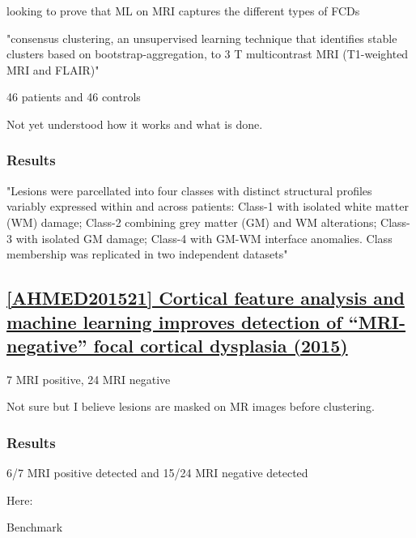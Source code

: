 looking to prove that ML on MRI captures the different types of FCDs

"consensus clustering, an unsupervised learning technique that identifies stable clusters based on bootstrap-aggregation, to 3 T multicontrast MRI (T1-weighted MRI and FLAIR)"

46 patients and 46 controls

Not yet understood how it works and what is done.

\subsubsection{Results}

"Lesions were parcellated into four classes with distinct structural profiles variably expressed within and across patients: Class-1 with isolated white matter (WM) damage; Class-2 combining grey matter (GM) and WM alterations; Class-3 with isolated GM damage; Class-4 with GM-WM interface anomalies. Class membership was replicated in two independent datasets"

\newpage
\subsection{\href{https://www.sciencedirect.com/science/article/pii/S1525505015002322}{[AHMED201521] Cortical feature analysis and machine learning improves detection of “MRI-negative” focal cortical dysplasia (2015) }}
\label{ul2}

7 MRI positive, 24 MRI negative

Not sure but I believe lesions are masked on MR images before clustering.

\subsubsection{Results}

6/7 MRI positive detected and 15/24 MRI negative detected

Here: 

\begin{table}[htbp]
	\centering
	\caption{Benchmark}

	\caption{Results from }%
	\label{tab:ul2}
\end{table}

